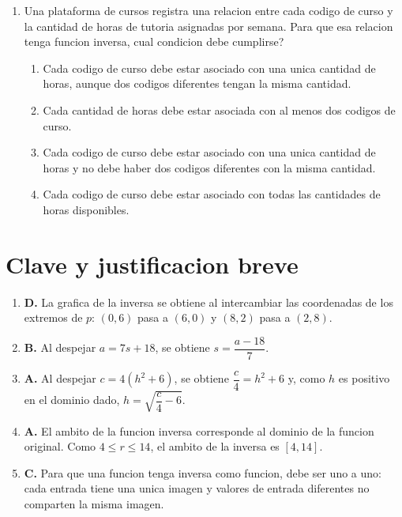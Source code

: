 \documentclass[12pt]{article}
\begin{document}
\begin{enumerate}[label=\textbf{\arabic*.}, itemsep=1.05cm]
De acuerdo con la informacion anterior, si se define la funcion $r$, la cual corresponde a la funcion inversa de $q$, entonces, \textquestiondown cual es el ambito de $r$?

\begin{enumerate}[label=\Alph*)]
  \item $[4,14]$
  \item $[17,82]$
  \item $[32,82]$
  \item $[32,70]$
\end{enumerate}

\Needspace{0.58\textheight}
\item
Una plataforma de cursos registra una relacion entre cada codigo de curso y la cantidad de horas de tutoria asignadas por semana. Para que esa relacion tenga funcion inversa, \textquestiondown cual condicion debe cumplirse?

\begin{enumerate}[label=\Alph*)]
  \item Cada codigo de curso debe estar asociado con una unica cantidad de horas, aunque dos codigos diferentes tengan la misma cantidad.
  \item Cada cantidad de horas debe estar asociada con al menos dos codigos de curso.
  \item Cada codigo de curso debe estar asociado con una unica cantidad de horas y no debe haber dos codigos diferentes con la misma cantidad.
  \item Cada codigo de curso debe estar asociado con todas las cantidades de horas disponibles.
\end{enumerate}

\end{enumerate}

\section*{Clave y justificacion breve}

\begin{enumerate}[label=\textbf{\arabic*.}]
  \item \textbf{D.} La grafica de la inversa se obtiene al intercambiar las coordenadas de los extremos de $p$: $(0,6)$ pasa a $(6,0)$ y $(8,2)$ pasa a $(2,8)$.
  \item \textbf{B.} Al despejar $a=7s+18$, se obtiene $s=\dfrac{a-18}{7}$.
  \item \textbf{A.} Al despejar $c=4(h^2+6)$, se obtiene $\dfrac{c}{4}=h^2+6$ y, como $h$ es positivo en el dominio dado, $h=\sqrt{\dfrac{c}{4}-6}$.
  \item \textbf{A.} El ambito de la funcion inversa corresponde al dominio de la funcion original. Como $4 \leq r \leq 14$, el ambito de la inversa es $[4,14]$.
  \item \textbf{C.} Para que una funcion tenga inversa como funcion, debe ser uno a uno: cada entrada tiene una unica imagen y valores de entrada diferentes no comparten la misma imagen.
\end{enumerate}
\end{document}
